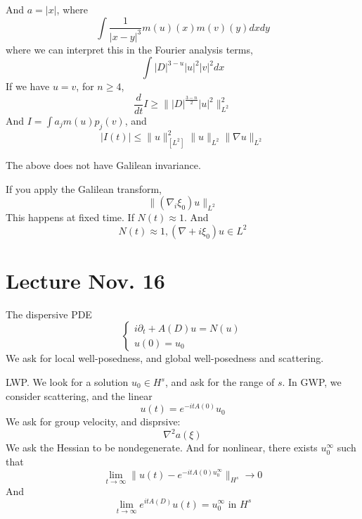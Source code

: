 And $a=|x|$, where 
\begin{equation*}
    \int\frac{1}{|x-y|^3}m(u)(x)m(v)(y)dxdy
\end{equation*}
where we can interpret this in the Fourier analysis terms, 
\begin{equation*}
    \int |D|^{3-u}|u|^2|v|^2dx
\end{equation*}
If we have $u=v$, for $n\geq 4$, 
\begin{equation*}
    \frac{d}{dt}I\geq\||D|^\frac{3-n}{2}|u|^2\|_{L^2}^2
\end{equation*}
And $I=\int a_jm(u)p_j(v)$, and 
\begin{equation*}
    |I(t)|\leq\|u\|_[L^2]^2\|u\|_{L^2}\|\nabla u\|_{L^2}
\end{equation*}
\begin{note}
    The above does not have Galilean invariance.
\end{note}
If you apply the Galilean transform, 
\begin{equation*}
    \|(\nabla _i\xi_0)u\|_{L^2}
\end{equation*}
This happens at fixed time. If $N(t)\approx 1$. And 
\begin{equation*}
    N(t)\approx 1, (\nabla +i\xi_0)u\in L^2
\end{equation*}


\section{Lecture Nov. 16}
The dispersive PDE
\begin{equation*}
    \begin{cases*}
        i\partial_t+A(D)u=N(u)\\
        u(0)=u_0
    \end{cases*}
\end{equation*}
We ask for local well-posedness, and global well-posedness and scattering.

LWP. We look for a solution $u_0\in H^s$, and ask for the range of $s$. In GWP, we consider scattering, and the linear 
\begin{equation*}
    u(t)=e^{-itA(0)}u_0
\end{equation*}
We ask for group velocity, and disprsive:
\begin{equation*}
    \nabla^2a(\xi)
\end{equation*}
We ask the Hessian to be nondegenerate. And for nonlinear, there exists $u_0^\infty$ such that 
\begin{equation*}
    \lim_{t\to\infty}\|u(t)-e^{-itA(0)u_0^\infty}\|_{H^s}\to 0
\end{equation*}
And 
\begin{equation*}
    \lim_{t\to\infty}e^{itA(D)}u(t)=u_0^\infty \text{ in } H^s
\end{equation*}

